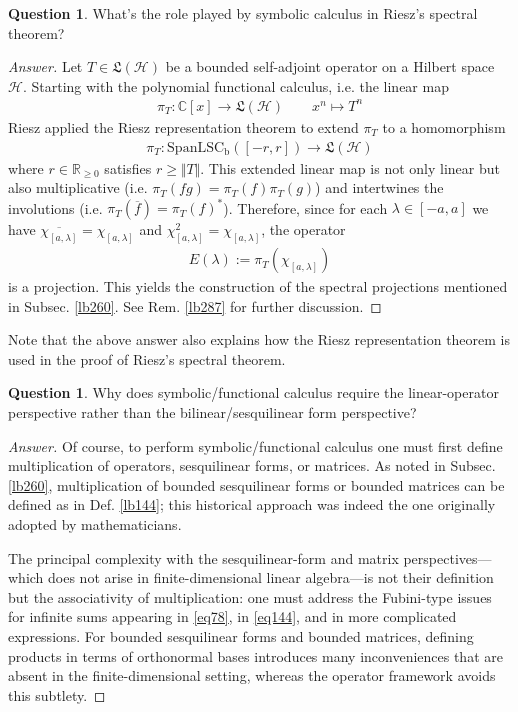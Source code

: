 \documentclass[12pt,b5paper,notitlepage]{article}
\theoremstyle{definition}
\newtheorem{question}[df]{Question}
\theoremstyle{plain}
\newcommand{\fk}{\mathfrak}
\newcommand{\ovl}{\overline}
\newcommand{\Span}{\mathrm{Span}}
\newcommand{\Cbb}{\mathbb C}
\newcommand{\Rbb}{\mathbb R}
\newcommand{\LSCb}{\mathrm{LSC}_{\mathrm b}}
\newcommand{\MH}{\mathcal H}
\numberwithin{equation}{section}
\begin{document}
\begin{question}\label{lb286}
What's the role played by symbolic calculus in Riesz's spectral theorem?
\end{question}

\begin{proof}[Answer]
Let $T\in\fk L(\MH)$ be a bounded self-adjoint operator on a Hilbert space $\MH$. Starting with the polynomial functional calculus, i.e. the linear map
\begin{align*}
\pi_T:\Cbb[x]\rightarrow \fk L(\MH)\qquad x^n\mapsto T^n
\end{align*}
Riesz applied the Riesz representation theorem to extend $\pi_T$ to a homomorphism
\begin{align*}
\pi_T:\Span\LSCb([-r,r])\rightarrow \fk L(\MH)
\end{align*}
where $r\in\Rbb_{\geq0}$ satisfies $r\geq\Vert T\Vert$. This extended linear map is not only linear but also multiplicative (i.e. $\pi_T(fg)=\pi_T(f)\pi_T(g)$) and intertwines the involutions (i.e. $\pi_T(\ovl f)=\pi_T(f)^*$). Therefore, since for each $\lambda\in[-a,a]$ we have $\ovl{\chi_{[a,\lambda]}}=\chi_{[a,\lambda]}$ and $\chi_{[a,\lambda]}^2=\chi_{[a,\lambda]}$, the operator
\begin{align*}
E(\lambda):=\pi_T(\chi_{[a,\lambda]})
\end{align*}
is a projection. This yields the construction of the spectral projections mentioned in Subsec. \ref{lb260}. See Rem. \ref{lb287} for further discussion.
\end{proof}


Note that the above answer also explains how the Riesz representation theorem is used in the proof of Riesz's spectral theorem.




\begin{question}
Why does symbolic/functional calculus require the linear-operator perspective rather than the bilinear/sesquilinear form perspective?
\end{question}



\begin{proof}[Answer]
Of course, to perform symbolic/functional calculus one must first define multiplication of operators, sesquilinear forms, or matrices. As noted in Subsec. \ref{lb260}, multiplication of bounded sesquilinear forms or bounded matrices can be defined as in Def. \ref{lb144}; this historical approach was indeed the one originally adopted by mathematicians. 

The principal complexity with the sesquilinear-form and matrix perspectives---which does not arise in finite-dimensional linear algebra---is not their definition but the associativity of multiplication: one must address the Fubini-type issues for infinite sums appearing in \eqref{eq78}, in \eqref{eq144}, and in more complicated expressions. For bounded sesquilinear forms and bounded matrices, defining products in terms of orthonormal bases introduces many inconveniences that are absent in the finite-dimensional setting, whereas the operator framework avoids this subtlety.
\end{proof}
\end{document}
